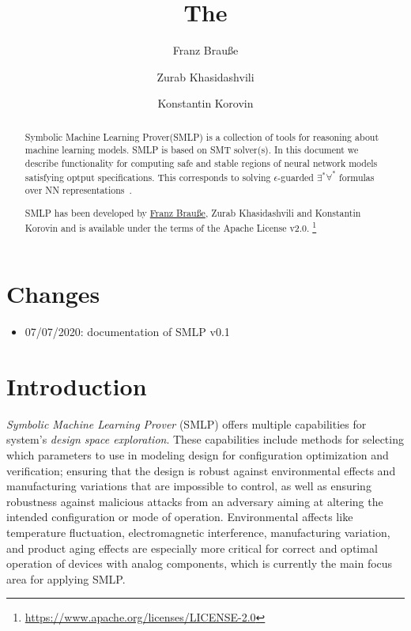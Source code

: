 \documentclass[a4paper,parskip=half]{article} %
\title{The \Solver}
\author{%
	Franz Brauße \and
	Zurab Khasidashvili \and
	Konstantin Korovin
}
\newcommand*\Solver{Symbolic Machine Learning Prover\xspace}
\newcommand*\SolverAbbrvText{SMLP}
\newcommand*\SolverAbbrv{\SolverAbbrvText\xspace}
\begin{document}
\maketitle
\begin{abstract}


\Solver (\SolverAbbrv) is a collection of tools for reasoning about machine
learning models. \SolverAbbrv is based on SMT solver(s). In this document we
describe functionality for computing safe and stable regions of neural network
models satisfying optput specifications. This corresponds to solving
$\epsilon$-guarded $\exists^*\forall^*$ formulas over NN
representations~\cite{DBLP:conf/fmcad/BrausseKK20}.


\SolverAbbrv has been developed by
\href{mailto:brausse@informatik.uni-trier.de?subject=\SolverAbbrvText}{Franz Brauße},
Zurab Khasidashvili
and Konstantin Korovin and is available
under the terms of the Apache License v2.0.%
\footnote{\url{https://www.apache.org/licenses/LICENSE-2.0}}
\end{abstract}
\tableofcontents

\section{Changes}
\begin{itemize}
\item 07/07/2020: documentation of \SolverAbbrv v0.1
\end{itemize}


\pagebreak

\section{Introduction}

\emph{Symbolic Machine Learning Prover} (SMLP) offers multiple capabilities for system's \emph{design space exploration}.
These capabilities include methods for selecting which parameters to use in modeling design for configuration optimization and verification;
ensuring that the design is robust against environmental effects and manufacturing variations that are impossible to control, as well as ensuring 
robustness against malicious attacks from an adversary aiming at altering the intended configuration or mode of operation.
Environmental affects like temperature fluctuation, electromagnetic interference, manufacturing variation, and product aging effects are especially 
more critical for correct and optimal operation of devices with analog components, which is currently the main focus area for applying  SMLP.
\end{document}
